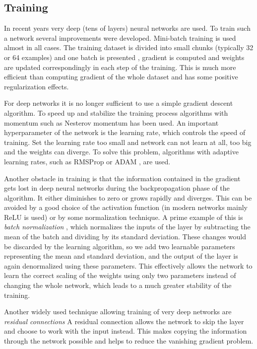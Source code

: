 \subsection{Training}
In recent years very deep (tens of layers) neural networks are used. To train such a network several improvements were developed. Mini-batch training is used almost in all cases. The training dataset is divided into small chunks (typically 32 or 64 examples) and one batch is presented , gradient is computed and weights are updated correspondingly in each step of the training. This is much more efficient than computing gradient of the whole dataset and has some positive regularization effects. \par
For deep networks it is no longer sufficient to use a simple gradient descent algorithm. To speed up and stabilize the training process algorithms with momentum such as Nesterov momentum \cite{sutskever_importance_2013} has been used. 
An important hyperparameter of the network is the learning rate, which controls the speed of training. Set the learning rate too small and network can not learn at all, too big and the weights can diverge. To solve this problem, algorithms with adaptive learning rates, such as 
RMSProp \cite{hinton_neural_nodate} or ADAM \cite{kingma_adam:_2014}, are used. \par
Another obstacle in training is that the information contained in the gradient gets lost in deep neural networks during the backpropagation phase of the algorithm. It either diminishes to zero or grows rapidly and diverges. This can be avoided by a good choice of the activation function (in modern networks mainly ReLU is used) or by some normalization technique. A prime example of this is \textit{batch normalization} \cite{ioffe_batch_2015}, which normalizes the inputs of the layer by subtracting the mean of the batch and dividing by its standard deviation. These changes would be discarded by the learning algorithm, so we add two learnable parameters representing the mean and standard deviation, and the output of the layer is again denormalized using these parameters. This effectively allows the network to learn the correct scaling of the weights using only two parameters instead of changing the whole network, which leads to a much greater stability of the training.\par
Another widely used technique allowing training of very deep networks are \textit{residual connections} \cite{szegedy_inception-v4_2016} A residual connection allows the network to skip the layer and choose to work with the input instead. This makes copying the information through the network possible and helps to reduce the vanishing gradient problem.

